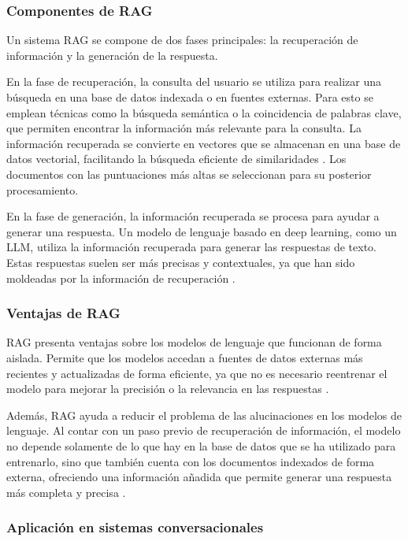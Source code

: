 \subsubsection{Componentes de RAG}
\label{subsec:componentes_rag}

Un sistema RAG se compone de dos fases principales: la recuperación de información y la generación de la respuesta.

En la fase de recuperación, la consulta del usuario se utiliza para realizar una búsqueda en una base de datos indexada o en fuentes externas. Para esto se emplean técnicas como la búsqueda semántica o la coincidencia de palabras clave, que permiten encontrar la información más relevante para la consulta. La información recuperada se convierte en vectores que se almacenan en una base de datos vectorial, facilitando la búsqueda eficiente de similaridades \cite{laparra2024retrieval}. Los documentos con las puntuaciones más altas se seleccionan para su posterior procesamiento.

En la fase de generación, la información recuperada se procesa para ayudar a generar una respuesta. Un modelo de lenguaje basado en deep learning, como un LLM, utiliza la información recuperada para generar las respuestas de texto. Estas respuestas suelen ser más precisas y contextuales, ya que han sido moldeadas por la información de recuperación \cite{laparra2024retrieval}.

\subsubsection{Ventajas de RAG}
\label{subsec:ventajas_rag}

RAG presenta ventajas sobre los modelos de lenguaje que funcionan de forma aislada. Permite que los modelos accedan a fuentes de datos externas más recientes y actualizadas de forma eficiente, ya que no es necesario reentrenar el modelo para mejorar la precisión o la relevancia en las respuestas \cite{laparra2024retrieval}.

Además, RAG ayuda a reducir el problema de las alucinaciones en los modelos de lenguaje. Al contar con un paso previo de recuperación de información, el modelo no depende solamente de lo que hay en la base de datos que se ha utilizado para entrenarlo, sino que también cuenta con los documentos indexados de forma externa, ofreciendo una información añadida que permite generar una respuesta más completa y precisa \cite{laparra2024retrieval}.

\subsubsection{Aplicación en sistemas conversacionales}
\label{subsec:aplicacion_rag}

